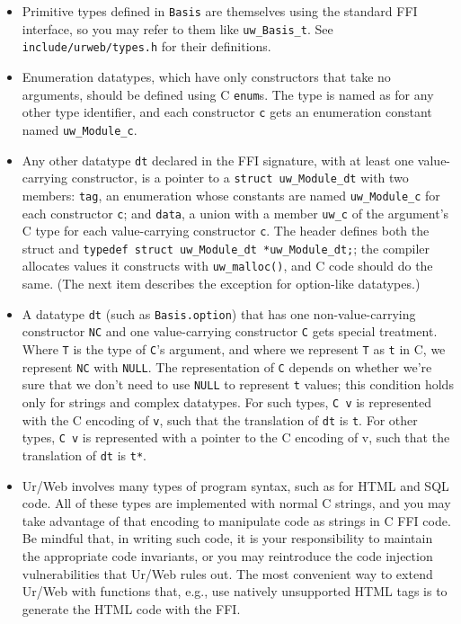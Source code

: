 \documentclass{article}
\begin{document}
\begin{itemize}
  \item Primitive types defined in \texttt{Basis} are themselves using the standard FFI interface, so you may refer to them like \texttt{uw\_Basis\_t}.  See \texttt{include/urweb/types.h} for their definitions.
  \item Enumeration datatypes, which have only constructors that take no arguments, should be defined using C \texttt{enum}s.  The type is named as for any other type identifier, and each constructor \texttt{c} gets an enumeration constant named \texttt{uw\_Module\_c}.
  \item Any other datatype \texttt{dt} declared in the FFI signature, with at least one value-carrying constructor, is a pointer to a \texttt{struct uw\_Module\_dt} with two members: \texttt{tag}, an enumeration whose constants are named \texttt{uw\_Module\_c} for each constructor \texttt{c}; and \texttt{data}, a union with a member \texttt{uw\_c} of the argument's C type for each value-carrying constructor \texttt{c}.  The header defines both the struct and \texttt{typedef struct uw\_Module\_dt *uw\_Module\_dt;}; the compiler allocates values it constructs with \texttt{uw\_malloc()}, and C code should do the same.  (The next item describes the exception for option-like datatypes.)
  \item A datatype \texttt{dt} (such as \texttt{Basis.option}) that has one non-value-carrying constructor \texttt{NC} and one value-carrying constructor \texttt{C} gets special treatment.  Where \texttt{T} is the type of \texttt{C}'s argument, and where we represent \texttt{T} as \texttt{t} in C, we represent \texttt{NC} with \texttt{NULL}.  The representation of \texttt{C} depends on whether we're sure that we don't need to use \texttt{NULL} to represent \texttt{t} values; this condition holds only for strings and complex datatypes.  For such types, \texttt{C v} is represented with the C encoding of \texttt{v}, such that the translation of \texttt{dt} is \texttt{t}.  For other types, \texttt{C v} is represented with a pointer to the C encoding of v, such that the translation of \texttt{dt} is \texttt{t*}.
  \item Ur/Web involves many types of program syntax, such as for HTML and SQL code.  All of these types are implemented with normal C strings, and you may take advantage of that encoding to manipulate code as strings in C FFI code.  Be mindful that, in writing such code, it is your responsibility to maintain the appropriate code invariants, or you may reintroduce the code injection vulnerabilities that Ur/Web rules out.  The most convenient way to extend Ur/Web with functions that, e.g., use natively unsupported HTML tags is to generate the HTML code with the FFI.
\end{itemize}
\end{document}
